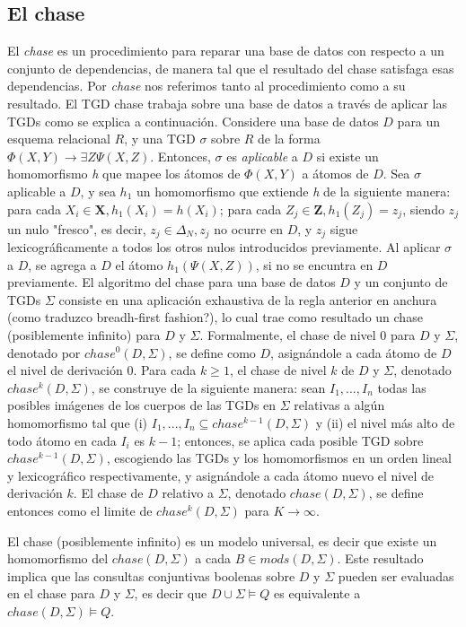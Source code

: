 \documentclass[11pt,a4paper,twoside]{tesis}
\begin{document}
\subsection{El chase}

El \textit{chase} es un procedimiento para reparar una base de datos con respecto a un conjunto de dependencias, de manera tal que el resultado del chase satisfaga esas dependencias. Por \textit{chase} nos referimos tanto al procedimiento como a su resultado. El TGD chase trabaja sobre una base de datos a través de aplicar las TGDs como se explica a continuación. Considere una base de datos $D$ para un esquema relacional $R$, y una TGD $\sigma$ sobre $R$ de la forma $\Phi (X, Y) \rightarrow \exists Z \Psi (X, Z)$. Entonces, $\sigma$ es \textit{aplicable} a $D$ si existe un homomorfismo \textit{h} que mapee los átomos de $\Phi (X, Y)$ a átomos de $D$. Sea $\sigma$ aplicable a $D$, y sea $h_1$ un homomorfismo que extiende \textit{h} de la siguiente manera: para cada $X_i \in \textbf{X}, h_1(X_i) = h(X_i)$; para cada $Z_j \in \textbf{Z}, h_1(Z_j) = z_j$, siendo $z_j$ un nulo "fresco", es decir, $z_j \in \Delta_N, z_j$ no ocurre en $D$, y $z_j$ sigue lexicográficamente a todos los otros nulos introducidos previamente. Al aplicar $\sigma$ a $D$, se agrega a $D$ el átomo $h_1(\Psi (X, Z))$, si no se encuntra en $D$ previamente.
El algoritmo del chase para una base de datos $D$ y un conjunto de TGDs $\Sigma$ consiste en una aplicación exhaustiva de la regla anterior en anchura (como traduzco breadh-first fashion?), lo cual trae como resultado un chase (posiblemente infinito) para $D$ y $\Sigma$. Formalmente, el chase de nivel 0 para $D$ y $\Sigma$, denotado por $chase^0(D,\Sigma)$, se define como $D$, asignándole a cada átomo de $D$ el nivel de derivación 0. Para cada $k \geq 1$, el chase de nivel $k$ de $D$ y $\Sigma$, denotado $chase^k(D, \Sigma)$, se construye de la siguiente manera: sean $I_1,...,I_n$ todas las posibles imágenes de los cuerpos de las TGDs en $\Sigma$ relativas a algún homomorfismo tal que (i) $I_1,...,I_n \subseteq chase^{k-1}(D,\Sigma)$ y (ii) el nivel más alto de todo átomo en cada $I_i$ es $k - 1$; entonces, se aplica cada posible TGD sobre $chase^{k-1}(D,\Sigma)$, escogiendo las TGDs y los homomorfismos en un orden lineal y lexicográfico respectivamente, y asignándole a cada átomo nuevo el nivel de derivación $k$. El chase de $D$ relativo a $\Sigma$, denotado $chase(D,\Sigma)$, se define entonces como el limite de $chase^k(D,\Sigma)$ para $K \rightarrow \infty$. 

El chase (posiblemente infinito) es un modelo universal, es decir que existe un homomorfismo del $chase(D, \Sigma)$ a cada $B \in mods(D,\Sigma)$. Este resultado implica que las consultas conjuntivas boolenas sobre $D$ y $\Sigma$ pueden ser evaluadas en el chase para $D$ y $\Sigma$, es decir que $D \cup \Sigma \models Q$ es equivalente a $chase(D, \Sigma) \models Q$. 
\end{document}
